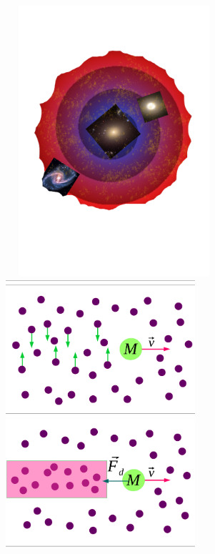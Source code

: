 \begin{figure}[H]
\centering
 \includegraphics[height=10cm, width=8cm,trim={0cm 2cm 0cm 2.cm},clip]{Figures/dynfric.pdf}
 \includegraphics[height=10cm, width=7cm]{Figures/fd.pdf}
 \caption{}
 \label{fig:canfric}
\end{figure}

